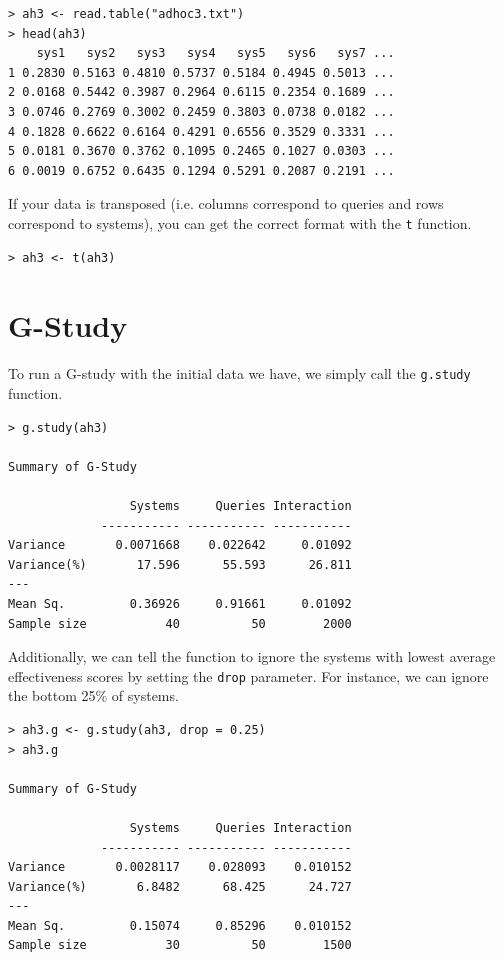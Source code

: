 \documentclass[twoside]{article}
\begin{document}
{\small\begin{verbatim}
> ah3 <- read.table("adhoc3.txt")
> head(ah3)
    sys1   sys2   sys3   sys4   sys5   sys6   sys7 ...
1 0.2830 0.5163 0.4810 0.5737 0.5184 0.4945 0.5013 ...
2 0.0168 0.5442 0.3987 0.2964 0.6115 0.2354 0.1689 ...
3 0.0746 0.2769 0.3002 0.2459 0.3803 0.0738 0.0182 ...
4 0.1828 0.6622 0.6164 0.4291 0.6556 0.3529 0.3331 ...
5 0.0181 0.3670 0.3762 0.1095 0.2465 0.1027 0.0303 ...
6 0.0019 0.6752 0.6435 0.1294 0.5291 0.2087 0.2191 ...
\end{verbatim}}

If your data is transposed (i.e. columns correspond to queries and rows correspond to systems), you can get the correct format with the \texttt{t} function.

{\small\begin{verbatim}
> ah3 <- t(ah3)
\end{verbatim}}

\section{G-Study}

To run a G-study with the initial data we have, we simply call the \texttt{g.study} function.

{\small\begin{verbatim}
> g.study(ah3)

Summary of G-Study

                 Systems     Queries Interaction
             ----------- ----------- -----------
Variance       0.0071668    0.022642     0.01092
Variance(%)       17.596      55.593      26.811
---
Mean Sq.         0.36926     0.91661     0.01092
Sample size           40          50        2000
\end{verbatim}}

Additionally, we can tell the function to ignore the systems with lowest average effectiveness scores by setting the \texttt{drop} parameter. For instance, we can ignore the bottom 25\% of systems.

{\small\begin{verbatim}
> ah3.g <- g.study(ah3, drop = 0.25)
> ah3.g

Summary of G-Study

                 Systems     Queries Interaction
             ----------- ----------- -----------
Variance       0.0028117    0.028093    0.010152
Variance(%)       6.8482      68.425      24.727
---
Mean Sq.         0.15074     0.85296    0.010152
Sample size           30          50        1500
\end{verbatim}}
\end{document}
